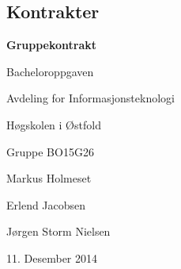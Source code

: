 \begin{center}

\chapter{Kontrakter}
\vspace{20pt}
\begin{Huge}

\hspace{55pt}\textbf{Gruppekontrakt}\newline

\vspace{20pt}
Bacheloroppgaven

Avdeling for Informasjonsteknologi

Høgskolen i Østfold

Gruppe BO15G26

\end{Huge}
\vspace{40pt}
\begin{LARGE}
Markus Holmeset

Erlend Jacobsen

Jørgen Storm Nielsen

\vspace{40pt}
11. Desember 2014
\end{LARGE}

\end{center}
\newpage


